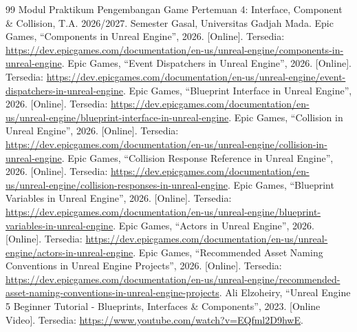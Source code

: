 \documentclass[a4paper,oneside,12pt]{report}
\renewcommand{\bibname}{Daftar Pustaka}
\begin{document}
\clearpage
{}
\renewcommand{\bibname}{Daftar Pustaka}
\begin{thebibliography}{99}
     Modul Praktikum Pengembangan Game Pertemuan 4: Interface, Component \& Collision, T.A. 2026/2027. Semester Gasal, Universitas Gadjah Mada.
     Epic Games, ``Components in Unreal Engine'', 2026. [Online]. Tersedia: \url{https://dev.epicgames.com/documentation/en-us/unreal-engine/components-in-unreal-engine}.
     Epic Games, ``Event Dispatchers in Unreal Engine'', 2026. [Online]. Tersedia: \url{https://dev.epicgames.com/documentation/en-us/unreal-engine/event-dispatchers-in-unreal-engine}.
     Epic Games, ``Blueprint Interface in Unreal Engine'', 2026. [Online]. Tersedia: \url{https://dev.epicgames.com/documentation/en-us/unreal-engine/blueprint-interface-in-unreal-engine}.
     Epic Games, ``Collision in Unreal Engine'', 2026. [Online]. Tersedia: \url{https://dev.epicgames.com/documentation/en-us/unreal-engine/collision-in-unreal-engine}.
     Epic Games, ``Collision Response Reference in Unreal Engine'', 2026. [Online]. Tersedia: \url{https://dev.epicgames.com/documentation/en-us/unreal-engine/collision-responses-in-unreal-engine}.
     Epic Games, ``Blueprint Variables in Unreal Engine'', 2026. [Online]. Tersedia: \url{https://dev.epicgames.com/documentation/en-us/unreal-engine/blueprint-variables-in-unreal-engine}.
     Epic Games, ``Actors in Unreal Engine'', 2026. [Online]. Tersedia: \url{https://dev.epicgames.com/documentation/en-us/unreal-engine/actors-in-unreal-engine}.
     Epic Games, ``Recommended Asset Naming Conventions in Unreal Engine Projects'', 2026. [Online]. Tersedia: \url{https://dev.epicgames.com/documentation/en-us/unreal-engine/recommended-asset-naming-conventions-in-unreal-engine-projects}.
     Ali Elzoheiry, ``Unreal Engine 5 Beginner Tutorial - Blueprints, Interfaces \& Components'', 2023. [Online Video]. Tersedia: \url{https://www.youtube.com/watch?v=EQfml2D9hwE}.
\end{thebibliography}
\end{document}
